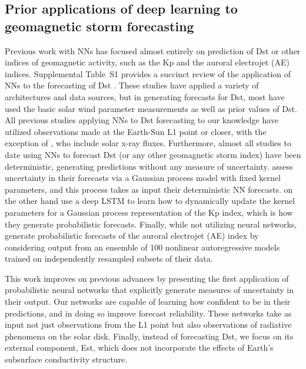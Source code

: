 \subsection{Prior applications of deep learning to geomagnetic storm forecasting}\label{sec:prior_work}
Previous work with NNs has focused almost entirely on prediction of Dst or other indices of geomagnetic activity, such as the Kp and the auroral electrojet (AE) indices. Supplemental Table~S1 provides a succinct review of the application of NNs to the forecasting of Dst \citep{Andriyas2015, Bala2012, Gleisner1996, Jankovivcova2002, Kugblenu1999, Lazzus2017, Munsami2000, Pallocchia2006, Revallo2014, Sharifie2006, Stepanova2005, Stepanova2000, Wei2007, Wu1996, Wu1997a}. These studies have applied a variety of architectures and data sources, but in generating forecasts for Dst, most have used the basic solar wind parameter measurements as well as prior values of Dst. All previous studies applying NNs to Dst forecasting to our knowledge have utilized observations made at the Earth-Sun L1 point or closer, with the exception of \cite{Chakraborty2020}, who include solar x-ray fluxes. Furthermore, almost all studies to date using NNs to forecast Dst (or any other geomagnetic storm index) have been deterministic, generating predictions without any measure of uncertainty. \cite{Gruet2018} assess uncertainty in their forecasts via a Gaussian process model with fixed kernel parameters, and this process takes as input their deterministic NN forecasts. \cite{Chakraborty2020} on the other hand use a deep LSTM to learn how to dynamically update the kernel parameters for a Gaussian process representation of the Kp index, which is how they generate probabilistic forecasts. Finally, while not utilizing neural networks, \cite{Gu2019} generate probabilistic forecasts of the auroral electrojet (AE) index by considering output from an ensemble of 100 nonlinear autoregressive models trained on independently resampled subsets of their data.

This work improves on previous advances by presenting the first application of probabilistic neural networks that explicitly generate measures of uncertainty in their output. Our networks are capable of learning how confident to be in their predictions, and in doing so improve forecast reliability. These networks take as input not just observations from the L1 point but also observations of radiative phenomena on the solar disk. Finally, instead of forecasting Dst, we focus on its external component, Est, which does not incorporate the effects of Earth's subsurface conductivity structure.